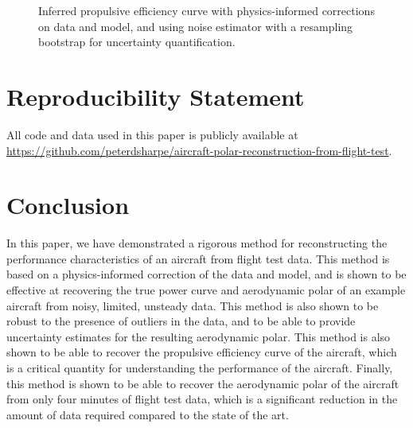 \documentclass[conf]{new-aiaa}
\begin{document}
    \begin{figure}[h]
        \centering
        \caption{Inferred propulsive efficiency curve with physics-informed corrections on data and model, and using noise estimator with a resampling bootstrap for uncertainty quantification.}
        \label{fig:propeller_polar_with_physics}
    \end{figure}


    \section{Reproducibility Statement}

    All code and data used in this paper is publicly available at \url{https://github.com/peterdsharpe/aircraft-polar-reconstruction-from-flight-test}.

    \afterpage{\FloatBarrier}

    \section{Conclusion}
    \label{sec:conclusion}

    In this paper, we have demonstrated a rigorous method for reconstructing the performance characteristics of an aircraft from flight test data. This method is based on a physics-informed correction of the data and model, and is shown to be effective at recovering the true power curve and aerodynamic polar of an example aircraft from noisy, limited, unsteady data. This method is also shown to be robust to the presence of outliers in the data, and to be able to provide uncertainty estimates for the resulting aerodynamic polar. This method is also shown to be able to recover the propulsive efficiency curve of the aircraft, which is a critical quantity for understanding the performance of the aircraft. Finally, this method is shown to be able to recover the aerodynamic polar of the aircraft from only four minutes of flight test data, which is a significant reduction in the amount of data required compared to the state of the art.
\end{document}
